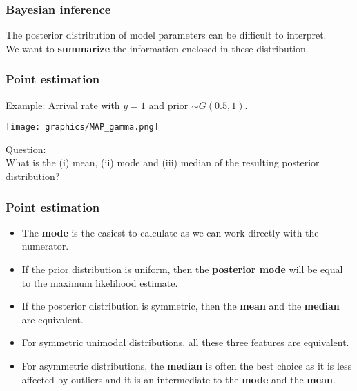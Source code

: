\documentclass{beamer}
\newcommand{\1}{\ensuremath{\mathbf{1}}}
\begin{document}
%
%
%
\begin{frame}\frametitle{Bayesian inference}
	The posterior distribution of model parameters can be difficult to interpret.\\[2ex]
	We want to \textbf{summarize} the information enclosed in these distribution.
\end{frame}
%
%
%
\begin{frame}\frametitle{Point estimation}
	Example: Arrival rate with $y = 1$ and prior $\sim G (0.5, 1)$.
	\begin{center}
		\texttt{[image: graphics/MAP\_gamma.png]}
	\end{center}
	Question:\\
	What is the (i) mean, (ii) mode and (iii) median of the resulting posterior distribution?
\end{frame}
%
%
%
\begin{frame}\frametitle{Point estimation}
	\begin{itemize}
		\item The \textbf{mode} is the easiest to calculate as we can work directly with the numerator.
		\item If the prior distribution is uniform, then the \textbf{posterior mode} will be equal to the maximum likelihood estimate.
		\item If the posterior distribution is symmetric, then the \textbf{mean} and the \textbf{median} are equivalent.
		\item For symmetric unimodal distributions, all these three features are equivalent.
		\item For asymmetric distributions, the \textbf{median} is often the best choice as it is less affected by outliers and it is an intermediate to the \textbf{mode} and the \textbf{mean}.
	\end{itemize}
\end{frame}
\end{document}
